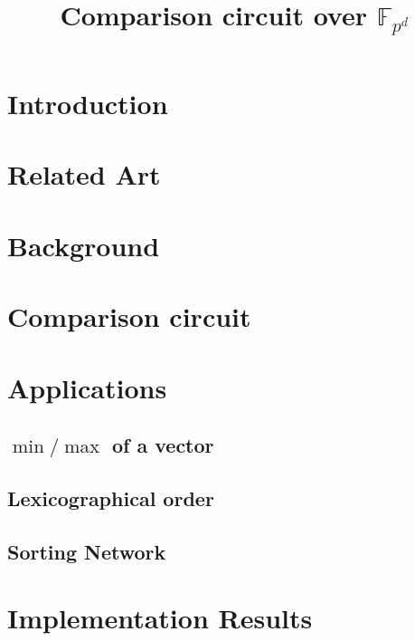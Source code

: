 \documentclass[a4paper,11pt]{article}
\title{Comparison circuit over $\mathbb{F}_{p^d}$}
\date{}
\author{}
\theoremstyle{definition}
\begin{document}
\maketitle

\section{Introduction}
\label{sec:introduction}




\section{Related Art}
\label{sec:related-art}



\section{Background}
\label{sec:background}



\section{Comparison circuit}
\label{sec:comparison-circuit}



\section{Applications}
\label{sec:applications}

\subsection{$\min/\max$ of a vector}
\label{sec:min/max}

\subsection{Lexicographical order}
\label{sec:lexic-order}

\subsection{Sorting Network}
\label{sec:sorting-network}


\section{Implementation Results}
\label{sec:impl-results}




\end{document}
